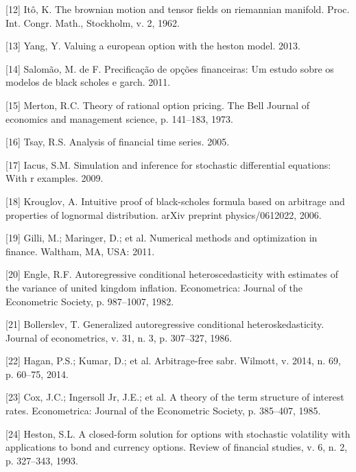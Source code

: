 \documentclass[12pt,twoside]{reedthesis}
\theoremstyle{definition}
\theoremstyle{definition}
\theoremstyle{remark}
\begin{document}
  \hypertarget{ref-ito1962}{}
  {[}12{]} Itô, K. The brownian motion and tensor fields on riemannian
  manifold. Proc. Int. Congr. Math., Stockholm, v. 2, 1962.
  
  \hypertarget{ref-yang2013valuing}{}
  {[}13{]} Yang, Y. Valuing a european option with the heston model. 2013.
  
  \hypertarget{ref-salomao2011precificaccao}{}
  {[}14{]} Salomão, M. de F. Precificação de opções financeiras: Um estudo
  sobre os modelos de black scholes e garch. 2011.
  
  \hypertarget{ref-merton1973theory}{}
  {[}15{]} Merton, R.C. Theory of rational option pricing. The Bell
  Journal of economics and management science, p. 141--183, 1973.
  
  \hypertarget{ref-tsay2005analysis}{}
  {[}16{]} Tsay, R.S. Analysis of financial time series. 2005.
  
  \hypertarget{ref-iacus2009simulation}{}
  {[}17{]} Iacus, S.M. Simulation and inference for stochastic
  differential equations: With r examples. 2009.
  
  \hypertarget{ref-krouglov2006intuitive}{}
  {[}18{]} Krouglov, A. Intuitive proof of black-scholes formula based on
  arbitrage and properties of lognormal distribution. arXiv preprint
  physics/0612022, 2006.
  
  \hypertarget{ref-nmof}{}
  {[}19{]} Gilli, M.; Maringer, D.; et al. Numerical methods and
  optimization in finance. Waltham, MA, USA: 2011.
  
  \hypertarget{ref-engle1982autoregressive}{}
  {[}20{]} Engle, R.F. Autoregressive conditional heteroscedasticity with
  estimates of the variance of united kingdom inflation. Econometrica:
  Journal of the Econometric Society, p. 987--1007, 1982.
  
  \hypertarget{ref-bollerslev1986generalized}{}
  {[}21{]} Bollerslev, T. Generalized autoregressive conditional
  heteroskedasticity. Journal of econometrics, v. 31, n. 3, p. 307--327,
  1986.
  
  \hypertarget{ref-hagan2014arbitrage}{}
  {[}22{]} Hagan, P.S.; Kumar, D.; et al. Arbitrage-free sabr. Wilmott, v.
  2014, n. 69, p. 60--75, 2014.
  
  \hypertarget{ref-cox1985theory}{}
  {[}23{]} Cox, J.C.; Ingersoll Jr, J.E.; et al. A theory of the term
  structure of interest rates. Econometrica: Journal of the Econometric
  Society, p. 385--407, 1985.
  
  \hypertarget{ref-heston1993closed}{}
  {[}24{]} Heston, S.L. A closed-form solution for options with stochastic
  volatility with applications to bond and currency options. Review of
  financial studies, v. 6, n. 2, p. 327--343, 1993.
  
\end{document}
